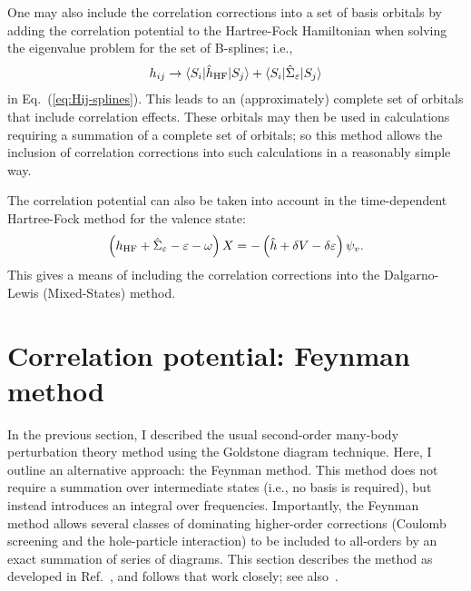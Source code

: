 \documentclass[10pt,twocolumn,a4paper]{article}%
\newcommand{\bra}[1]{\ensuremath{\langle #1|}}	%
\newcommand{\ket}[1]{\ensuremath{|#1\rangle}}	%
\newcommand{\be}{\begin{equation}}
\newcommand{\ee}{\end{equation}}
\def\en{\ensuremath{\varepsilon}}
\newcommand{\w}{\ensuremath{\omega}}
\begin{document}
One may also include the correlation corrections into a set of basis orbitals by adding the correlation potential to the Hartree-Fock Hamiltonian when solving the eigenvalue problem for the set of B-splines; i.e.,
\be
h_{ij} \to \bra{S_i}\hat h_{\rm HF}\ket{S_j}  + \bra{S_i}\hat \Sigma_\en\ket{S_j} 
\ee
in Eq.~(\ref{eq:Hij-splines}).
This leads to an (approximately) complete set of orbitals that include correlation effects.
These orbitals may then be used in calculations requiring a summation of a complete set of orbitals; so this method allows the inclusion of correlation corrections into such calculations in a reasonably simple way.


The correlation potential can also be taken into account in the time-dependent Hartree-Fock method for the valence state:
\be
\left( h_{\rm HF} +\hat\Sigma_\en -  \en -\w \right)X = -\left(\hat h + \delta V - \delta \en \right)\psi_v.
\ee
This gives a means of including the correlation corrections into the Dalgarno-Lewis (Mixed-States) method.












\section{Correlation potential: Feynman method}


In the previous section, I described the usual second-order many-body perturbation theory method using the Goldstone diagram technique.
Here, I outline an alternative approach: the Feynman method.
This method does not require a summation over intermediate states (i.e., no basis is required), but instead introduces an integral over frequencies.
Importantly, the Feynman method allows several classes of dominating higher-order corrections (Coulomb screening and the hole-particle interaction) to be included to all-orders by an exact summation of series of diagrams.
This section describes the method as developed in Ref.~\cite{DzubaCPM1988pla}, and follows that work closely; see also~\cite{Abrikosov1965,DzubaCPM1989plaEn,GingesCs2002}.
\end{document}
